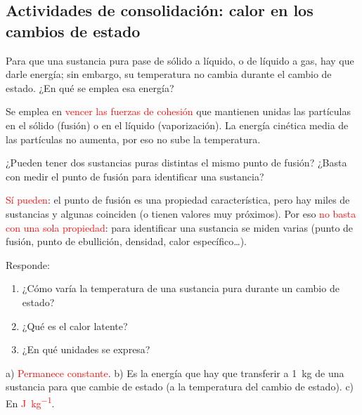 \subsection*{Actividades de consolidación: calor en los cambios de estado}

\begin{exercise}
    Para que una sustancia pura pase de sólido a líquido, o de líquido a gas, hay que darle energía; sin embargo, su temperatura no cambia durante el cambio de estado. ¿En qué se emplea esa energía?
    \begin{solu}
        Se emplea en \textcolor{red}{vencer las fuerzas de cohesión} que mantienen unidas las partículas en el sólido (fusión) o en el líquido (vaporización). La energía cinética media de las partículas no aumenta, por eso no sube la temperatura.
    \end{solu}
\end{exercise}

\begin{exercise}
    ¿Pueden tener dos sustancias puras distintas el mismo punto de fusión? ¿Basta con medir el punto de fusión para identificar una sustancia?
    \begin{solu}
        \textcolor{red}{Sí pueden}: el punto de fusión es una propiedad característica, pero hay miles de sustancias y algunas coinciden (o tienen valores muy próximos). Por eso \textcolor{red}{no basta con una sola propiedad}: para identificar una sustancia se miden varias (punto de fusión, punto de ebullición, densidad, calor específico\ldots).
    \end{solu}
\end{exercise}

\begin{exercise}
    Responde:
    \begin{enumerate}[label=\alph*)]
        \item ¿Cómo varía la temperatura de una sustancia pura durante un cambio de estado?
        \item ¿Qué es el calor latente?
        \item ¿En qué unidades se expresa?
    \end{enumerate}
    \begin{solu}
        a) \textcolor{red}{Permanece constante}. b) Es la energía que hay que transferir a \qty{1}{\kg} de una sustancia para que cambie de estado (a la temperatura del cambio de estado). c) En \textcolor{red}{\unit{\joule\per\kg}}.
    \end{solu}
\end{exercise}

